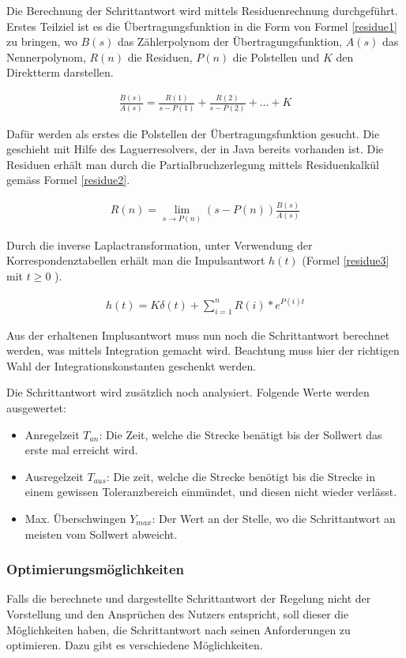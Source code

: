 Die Berechnung der Schrittantwort wird mittels Residuenrechnung durchgeführt. Erstes Teilziel ist es die Übertragungsfunktion in die Form von Formel \ref{residue1} zu bringen, wo $B(s)$ das Zählerpolynom der Übertragungsfunktion, $A(s)$ das Nennerpolynom, $R(n)$ die Residuen, $P(n)$ die Polstellen und $K$ den Direktterm darstellen.

\begin{align}
\frac{B(s)}{A(s)}=\frac{R(1)}{s-P(1)}+\frac{R(2)}{s-P(2)}+...+ K
\label{residue1}
\end{align}

Dafür werden als erstes die Polstellen der Übertragungsfunktion gesucht. Die geschieht mit Hilfe des Laguerresolvers, der in Java bereits vorhanden ist. Die Residuen erhält man durch die Partialbruchzerlegung mittels Residuenkalkül gemäss Formel \ref{residue2}.

\begin{align}
R(n)=\lim_{s \to P(n)}(s-P(n))\frac{B(s)}{A(s)}
\label{residue2}
\end{align}

Durch die inverse Laplactransformation, unter Verwendung der Korrespondenztabellen erhält man die Impulsantwort $h(t)$ (Formel \ref{residue3} mit $t\geq0$ ).

\begin{align}
h(t)=K\delta(t)+\sum_{i=1}^n R(i)*e^{P(i)t}
\label{residue3}
\end{align}

Aus der erhaltenen Implusantwort muss nun noch die Schrittantwort berechnet werden, was mittels Integration gemacht wird. Beachtung muss hier der richtigen Wahl der Integrationskonstanten geschenkt werden.

Die Schrittantwort wird zusätzlich noch analysiert. Folgende Werte werden ausgewertet:
\begin{itemize}
\item Anregelzeit $T_{an}$:   Die Zeit, welche die Strecke benätigt bis der Sollwert das erste mal erreicht wird.
\item Ausregelzeit $T_{aus}$:   Die zeit, welche die Strecke benötigt bis die Strecke in einem gewissen Toleranzbereich einmündet, und diesen nicht wieder verlässt.
\item Max. Überschwingen $Y_{max}$:   Der Wert an der Stelle, wo die Schrittantwort an meisten vom Sollwert abweicht.
\end{itemize}


\subsubsection{Optimierungsmöglichkeiten}
Falls die berechnete und dargestellte Schrittantwort der Regelung nicht der Vorstellung und den Ansprüchen des Nutzers entspricht, soll dieser die Möglichkeiten haben, die Schrittantwort nach seinen Anforderungen zu optimieren. Dazu gibt es verschiedene Möglichkeiten. 

